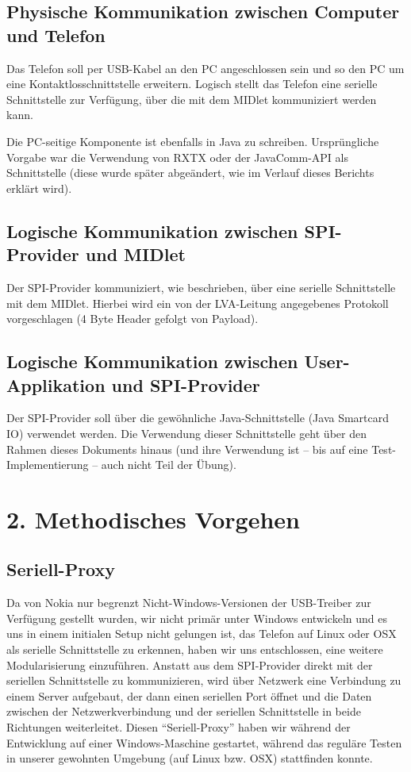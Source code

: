 \documentclass[paper=a4, fontsize=11pt]{scrartcl}
\begin{document}
\subsection{Physische Kommunikation zwischen Computer und Telefon}
Das Telefon soll per USB-Kabel an den PC angeschlossen sein und so den PC um eine Kontaktlosschnittstelle erweitern. Logisch stellt das Telefon eine serielle Schnittstelle zur Verfügung, über die mit dem MIDlet kommuniziert werden kann.

Die PC-seitige Komponente ist ebenfalls in Java zu schreiben. Ursprüngliche Vorgabe war die Verwendung von RXTX oder der JavaComm-API als Schnittstelle (diese wurde später abgeändert, wie im Verlauf dieses Berichts erklärt wird).

\subsection{Logische Kommunikation zwischen SPI-Provider und MIDlet}
Der SPI-Provider kommuniziert, wie beschrieben, über eine serielle Schnittstelle mit dem MIDlet. Hierbei wird ein von der LVA-Leitung angegebenes Protokoll vorgeschlagen (4 Byte Header gefolgt von Payload).

\subsection{Logische Kommunikation zwischen User-Applikation und SPI-Provider}
Der SPI-Provider soll über die gewöhnliche Java-Schnittstelle (Java Smartcard IO) verwendet werden. Die Verwendung dieser Schnittstelle geht über den Rahmen dieses Dokuments hinaus (und ihre Verwendung ist – bis auf eine Test-Implementierung – auch nicht Teil der Übung).


\section{2. Methodisches Vorgehen}
\subsection{Seriell-Proxy}
Da von Nokia nur begrenzt Nicht-Windows-Versionen der USB-Treiber zur Verfügung gestellt wurden, wir nicht primär unter Windows entwickeln und es uns in einem initialen Setup nicht gelungen ist, das Telefon auf Linux oder OSX als serielle Schnittstelle zu erkennen, haben wir uns entschlossen, eine weitere Modularisierung einzuführen. Anstatt aus dem SPI-Provider direkt mit der seriellen Schnittstelle zu kommunizieren, wird über Netzwerk eine Verbindung zu einem Server aufgebaut, der dann einen seriellen Port öffnet und die Daten zwischen der Netzwerkverbindung und der seriellen Schnittstelle in beide Richtungen weiterleitet. Diesen \enquote{Seriell-Proxy} haben wir während der Entwicklung auf einer Windows-Maschine gestartet, während das reguläre Testen in unserer gewohnten Umgebung (auf Linux bzw. OSX) stattfinden konnte.
\end{document}
